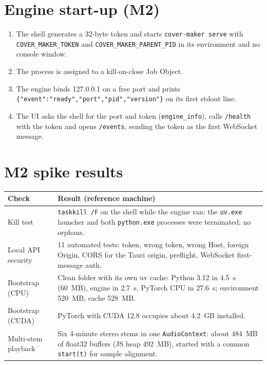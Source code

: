 \documentclass{covermaker}
\begin{document}
\section{Engine start-up (M2)}
\begin{enumerate}
  \item The shell generates a 32-byte token and starts \texttt{cover-maker serve}
        with \texttt{COVER\_MAKER\_TOKEN} and \texttt{COVER\_MAKER\_PARENT\_PID}
        in its environment and no console window.
  \item The process is assigned to a kill-on-close Job Object.
  \item The engine binds 127.0.0.1 on a free port and prints
        \texttt{\{"event":"ready","port","pid","version"\}} on its first stdout line.
  \item The UI asks the shell for the port and token (\texttt{engine\_info}),
        calls \texttt{/health} with the token and opens \texttt{/events}, sending
        the token as the first WebSocket message.
\end{enumerate}

\section{M2 spike results}
\begin{tabularx}{\linewidth}{@{}lY@{}}
\toprule
\textbf{Check} & \textbf{Result (reference machine)} \\
\midrule
Kill test & \texttt{taskkill /F} on the shell while the engine ran: the
\texttt{uv.exe} launcher and both \texttt{python.exe} processes were terminated;
no orphans. \\
Local API security & 11 automated tests: token, wrong token, wrong Host, foreign
Origin, CORS for the Tauri origin, preflight, WebSocket first-message auth. \\
Bootstrap (CPU) & Clean folder with its own uv cache: Python 3.12 in 4.5~s (60~MB),
engine in 2.7~s, PyTorch CPU in 27.6~s; environment 520~MB, cache 528~MB. \\
Bootstrap (CUDA) & PyTorch with CUDA 12.8 occupies about 4.2~GB installed. \\
Multi-stem playback & Six 4-minute stereo stems in one \texttt{AudioContext}: about
484~MB of float32 buffers (JS heap 492~MB), started with a common
\texttt{start(t)} for sample alignment. \\
\bottomrule
\end{tabularx}
\end{document}

